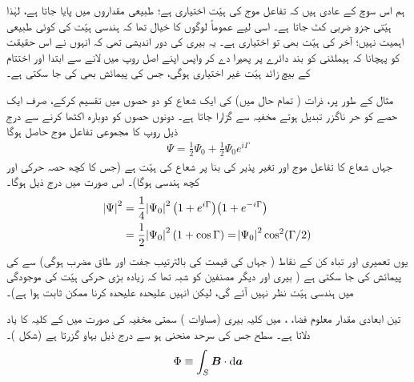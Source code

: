  ہم اس سوچ کے عادی ہیں کہ تفاعل موج کی  ہیّت اختیاری  ہے؛  طبیعی مقداروں میں   پایا جاتا ہے، لہٰذا   ہیّتی جزو ضربی  کٹ جاتا ہے۔  اسی لیے عموماً لوگوں کا خیال تھا کہ ہندسی ہیّت کی کوئی طبیعی اہمیت نہیں؛  آخر  کی  ہیّت بھی تو  اختیاری ہے۔  یہ  بیری کی دور اندیشی تھی  کہ انہوں نے اس حقیقت کو پہچانا کہ ہیملٹنی کو  بند دائرے پر  پھیرا دے کر  واپس اپنے  اصل روپ میں لانے سے ابتدا اور اختتام کے بیچ  زائد     ہیّت  غیر اختیاری ہوگی،    جس کی پیمائش بھی  کی جا سکتی  ہے۔
 
  مثال کے طور پر،  ذرات ( تمام حال  میں)  کی ایک شعاع کو دو حصوں میں تقسیم کرکے،  صرف ایک حصے کو حر ناگزر تبدیل ہوتے مخفیہ سے گزارا جاتا ہے۔ دونوں حصوں کو دوبارہ اکٹھا کرنے سے درج ذیل روپ کا  مجموعی تفاعل موج  حاصل ہوگا 
\begin{align}
\Psi = \frac{1}{2} \Psi_0 + \frac{1}{2} \Psi_0 e^{i \Gamma}
\end{align}
جہاں      شعاع کا تفاعل موج   اور     تغیر پذیر   کی بنا پر شعاع کی      ہیّت ہے  (جس کا کچھ حصہ حرکی اور کچھ ہندسی ہوگا)۔   اس صورت میں درج ذیل ہوگا۔
\begin{align}\label{مساوات_حر_ہیّتی_انتقال}
\abs{\Psi}^2 &= \frac{1}{4} \abs{\Psi_0}^2 \big ( 1 + e^{i \Gamma} \big ) \big ( 1 + e^{- i \Gamma} \big ) \nonumber\\
&= \frac{1}{2} \abs{\Psi_0}^2 (1 + \cos \Gamma) = \abs{\Psi_0}^2 \cos^2 (\Gamma/2)
\end{align}
یوں  تعمیری  اور تباہ کن کے نقاط   ( جہاں  کی قیمت  کی بالترتیب جفت اور طاق مضرب ہوگی)  سے    کی پیمائش کی جا سکتی ہے ( بیری اور دیگر مصنفین کو شبہ تھا کہ زیادہ بڑی حرکی ہیّت کی موجودگی میں ہندسی  ہیّت  نظر نہیں آئے گی،  لیکن انہیں علیحدہ علیحدہ  کرنا ممکن ثابت ہوا ہے)۔ 

 تین ابعادی مقدار معلوم فضا،  ،    میں کلیہ  بیری  (مساوات )  سمتی مخفیہ  کی صورت میں    کے  کلیہ کا  یاد دلاتا ہے۔ سطح  جس کی سرحد منحنی  ہو سے درج ذیل  بہاو گزرتا ہے  (شکل )۔ 
\begin{align}
\Phi \equiv \int_S \kvec{B} \cdot \dif \kvec{a}
\end{align}


